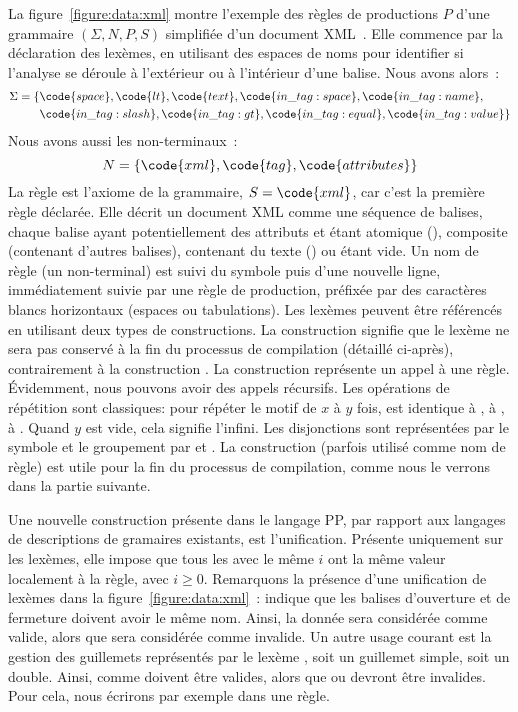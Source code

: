 La figure~\ref{figure:data:xml} montre l'exemple des règles de productions $P$
d'une grammaire $(\Sigma, N, P, S)$ simplifiée d'un document XML~.
Elle commence par la déclaration des lexèmes, en utilisant des espaces de noms
pour identifier si l'analyse se déroule à l'extérieur ou à l'intérieur d'une
balise. Nous avons alors~:
%
\begin{align*}
\Sigma = \{ & \code{space}, \code{lt}, \code{text}, \code{in\_tag:space},
              \code{in\_tag:name}, \\
            & \code{in\_tag:slash}, \code{in\_tag:gt}, \code{in\_tag:equal},
              \code{in\_tag:value} \}
\end{align*}
%
Nous avons aussi les non-terminaux~:
%
$$N = \{\code{xml}, \code{tag}, \code{attributes}\}$$
%
La règle  est l'axiome de la grammaire, $S = \code{xml}$, car c'est la
première règle déclarée. Elle décrit un document XML comme une séquence de
balises, chaque balise ayant potentiellement des attributs et étant atomique
(), composite (contenant d'autres balises), contenant du texte
() ou étant vide. Un nom de règle (un non-terminal)
est suivi du symbole \code{:} puis d'une nouvelle ligne, immédiatement suivie
par une règle de production, préfixée par des caractères blancs horizontaux
(espaces ou tabulations). Les lexèmes peuvent être référencés en utilisant deux
types de constructions. La construction  signifie que le lexème
ne sera pas conservé à la fin du processus de compilation (détaillé ci-après),
contrairement à la construction . La construction 
représente un appel à une règle. Évidemment, nous pouvons avoir des appels
récursifs. Les opérations de répétition sont classiques: 
pour répéter le motif de $x$ à $y$ fois,  est identique à , \code{+} à , \code{*} à . Quand $y$ est vide,
cela signifie l'infini. Les disjonctions sont représentées par le symbole
\code{\mvert} et le groupement par \code{(} et \code{)}. La construction
 (parfois utilisé comme nom de règle) est utile pour la fin du
processus de compilation, comme nous le verrons dans la partie suivante.

Une nouvelle construction présente dans le langage PP, par rapport aux langages
de descriptions de gramaires existants, est l'unification. Présente uniquement
sur les lexèmes, elle impose que tous les  avec le même $i$ ont
la même valeur localement à la règle, avec $i \geq 0$.  Remarquons la présence
d'une unification de lexèmes dans la figure~\ref{figure:data:xml}~:
 indique que les balises d'ouverture et de fermeture doivent avoir
le même nom. Ainsi, la donnée  sera considérée comme valide,
alors que  sera considérée comme invalide. Un autre usage
courant est la gestion des guillemets représentés par le lexème , soit un guillemet simple, soit un double. Ainsi,  comme
 doivent être valides, alors que  ou  devront être
invalides. Pour cela, nous écrirons par exemple  dans une règle.

